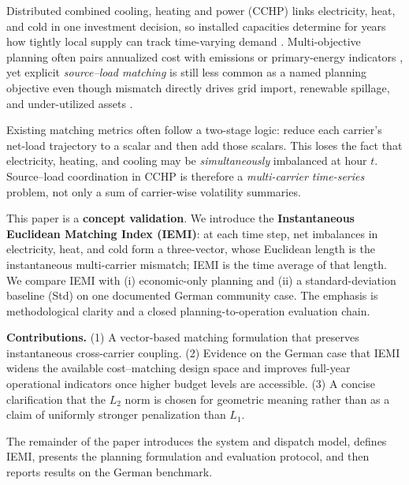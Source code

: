 Distributed combined cooling, heating and power (CCHP) links electricity, heat, and cold in one investment decision, so installed capacities determine for years how tightly local supply can track time-varying demand \cite{liu2018combined,wu2016multiobjective}. Multi-objective planning often pairs annualized cost with emissions or primary-energy indicators \cite{wang2019multi,deb2002fast}, yet explicit \emph{source--load matching} is still less common as a named planning objective even though mismatch directly drives grid import, renewable spillage, and under-utilized assets \cite{zhang2020comprehensive}.

Existing matching metrics often follow a two-stage logic: reduce each carrier's net-load trajectory to a scalar and then add those scalars. This loses the fact that electricity, heating, and cooling may be \emph{simultaneously} imbalanced at hour $t$. Source--load coordination in CCHP is therefore a \emph{multi-carrier time-series} problem, not only a sum of carrier-wise volatility summaries.

This paper is a \textbf{concept validation}. We introduce the \textbf{Instantaneous Euclidean Matching Index (IEMI)}: at each time step, net imbalances in electricity, heat, and cold form a three-vector, whose Euclidean length is the instantaneous multi-carrier mismatch; IEMI is the time average of that length. We compare IEMI with (i) economic-only planning and (ii) a standard-deviation baseline (Std) on one documented German community case. The emphasis is methodological clarity and a closed planning-to-operation evaluation chain.

\textbf{Contributions.} (1) A vector-based matching formulation that preserves instantaneous cross-carrier coupling. (2) Evidence on the German case that IEMI widens the available cost--matching design space and improves full-year operational indicators once higher budget levels are accessible. (3) A concise clarification that the $L_2$ norm is chosen for geometric meaning rather than as a claim of uniformly stronger penalization than $L_1$.

The remainder of the paper introduces the system and dispatch model, defines IEMI, presents the planning formulation and evaluation protocol, and then reports results on the German benchmark.
